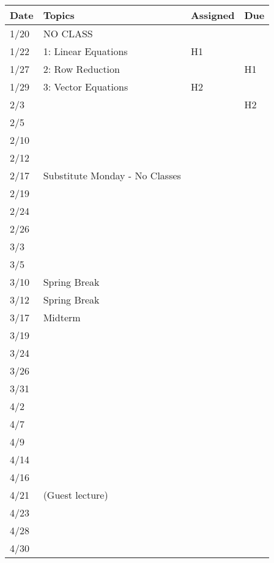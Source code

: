 \documentclass[11pt]{article}
\begin{document}
\small
\begin{centering}
\begin{tabular}{||l|p{3in}|l|l||}
\hline\hline
Date & Topics  & Assigned & Due  \\
\hline\hline
1/20 & NO CLASS && \\
1/22 & 1: Linear Equations & H1  & \\
\hline

1/27 & 2: Row Reduction & & H1 \\
1/29 & 3: Vector Equations & H2 & \\
\hline

2/3 & & & H2 \\
2/5 & & & \\
\hline

2/10 & & & \\
2/12 & & & \\
\hline

2/17 & Substitute Monday - No Classes & & \\
2/19 & & & \\
\hline

2/24 & & & \\
2/26 & & & \\
\hline

3/3 & & & \\
3/5 & & & \\
\hline

3/10 & Spring Break &&\\
3/12 & Spring Break &&\\
\hline

3/17 & Midterm & & \\
3/19 & & & \\
\hline

3/24 & & & \\
3/26 & & & \\
\hline

3/31 & & & \\
4/2 & & & \\
\hline

4/7 & & & \\
4/9 & & & \\
\hline

4/14 & & & \\
4/16 & & & \\
 \hline

4/21 & (Guest lecture) & & \\
4/23 & & & \\
\hline

4/28 & & & \\
4/30 & & & \\
\hline\hline

\end{tabular}\\
\end{centering}
\end{document}
